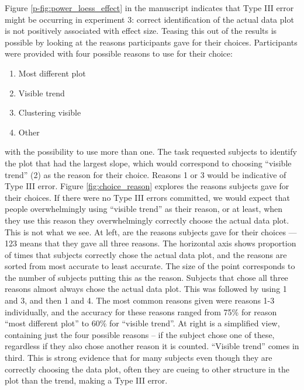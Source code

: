 \documentclass[12pt]{article}
\begin{document}
Figure \ref{p-fig:power_loess_effect} in the manuscript indicates that Type III error might be occurring in experiment 3: correct identification of the actual data plot is not positively associated with effect size. Teasing this out of the results is possible by looking at the reasons participants gave for their choices. Participants were provided with four possible reasons to use for their choice:


\begin{enumerate} \itemsep 0in
\item Most different plot
\item Visible trend
\item Clustering visible
\item Other
\end{enumerate}


\noindent with the possibility to use more than one. The task requested subjects to identify the plot that had the largest slope, which would correspond to choosing ``visible trend'' (2) as the reason for their choice. Reasons 1 or 3 would be indicative of Type III error. Figure \ref{fig:choice_reason} explores the reasons subjects gave for their choices. If there were no Type III errors committed, we would expect that people overwhelmingly using ``visible trend'' as their reason, or at least, when they use this reason they overwhelmingly correctly choose the actual data plot. This is not what we see. At left, are the reasons subjects gave for their choices --- 123 means that they gave all three reasons. The horizontal axis shows proportion of times that subjects correctly chose the actual data plot, and the reasons are sorted from most accurate to least accurate. The size of the point corresponds to the number of subjects putting this as the reason. Subjects that chose all three reasons almost always chose the actual data plot. This was followed by using 1 and 3, and then 1 and 4. The most common reasons given were reasons 1-3 individually, and the accuracy for these reasons ranged from 75\% for reason ``most different plot'' to 60\% for ``visible trend''.
At right is a simplified view, containing just the four possible reasons -- if the subject chose one of these, regardless if they also chose another reason it is counted. ``Visible trend'' comes in third. This is strong evidence that for many subjects even though they are correctly choosing the data plot, often they are cueing to other structure in the plot than the trend, making a Type III error. 
\end{document}

